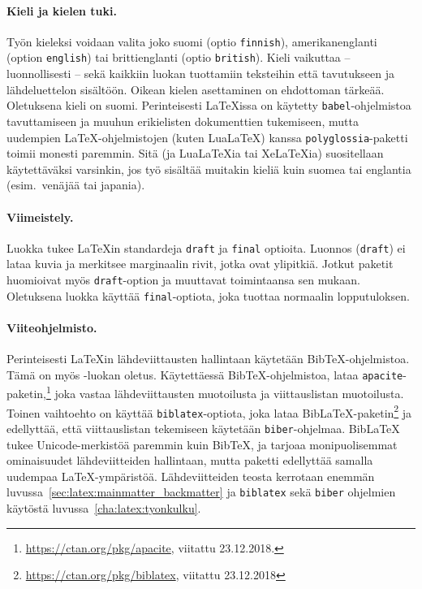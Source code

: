 \paragraph{Kieli ja kielen tuki.}

Työn kieleksi voidaan valita joko suomi (optio \texttt{finnish}), amerikanenglanti (option \texttt{english}) tai brittienglanti (optio \texttt{british}). Kieli vaikuttaa -- luonnollisesti -- sekä kaikkiin luokan tuottamiin teksteihin että tavutukseen ja lähdeluettelon sisältöön. Oikean kielen asettaminen on ehdottoman tärkeää. Ole\-tuk\-se\-na kieli on suomi. Perinteisesti \LaTeX{issa} on käytetty \texttt{babel}-ohjelmistoa tavuttamiseen ja muuhun erikielisten dokumenttien tukemiseen, mutta uudempien \LaTeX-ohjelmistojen (kuten Lua\LaTeX) kanssa \texttt{polyglossia}-paketti toimii monesti paremmin. Sitä (ja Lua\LaTeX{ia} tai Xe\LaTeX{ia}) suositellaan käytettäväksi varsinkin, jos työ sisältää muitakin kieliä kuin suomea tai englantia (esim.\ venäjää tai japania). 

\paragraph{Viimeistely.}

Luokka tukee \LaTeX{in} standardeja \texttt{draft} ja \texttt{final} optioita. Luonnos (\texttt{draft}) ei lataa kuvia ja merkitsee marginaalin rivit, jotka ovat ylipitkiä. Jotkut paketit huomioivat myös \texttt{draft}-option ja muuttavat toimintaansa sen mukaan. Ole\-tuk\-se\-na luokka käyttää \texttt{final}-optiota, joka tuottaa normaalin lopputuloksen.

\paragraph{Viiteohjelmisto.}

Perinteisesti \LaTeX{in} lähdeviittausten hallintaan käytetään Bib\TeX-oh\-jel\-mis\-toa. Tämä on myös \uefcsthesis-luokan oletus. Käytettäessä Bib\TeX-oh\-jel\-mis\-toa, \uefcsthesis lataa \texttt{apacite}-paketin,\!\footnote{\url{https://ctan.org/pkg/apacite}, viitattu 23.12.2018.} joka vastaa lähdeviittausten muotoilusta ja viittauslistan muotoilusta. Toinen vaihtoehto on käyttää \texttt{biblatex}-optiota, joka lataa Bib\LaTeX-paketin\footnote{\url{https://ctan.org/pkg/biblatex}, viitattu 23.12.2018} ja edellyttää, että viittauslistan tekemiseen käytetään \texttt{biber}-ohjelmaa. Bib\LaTeX{} tukee Unicode-merkistöä paremmin kuin Bib\TeX, ja tarjoaa monipuolisemmat ominaisuudet lähdeviitteiden hallintaan, mutta paketti edellyttää samalla uudempaa \LaTeX-ympäristöä. Lähdeviitteiden teosta kerrotaan enemmän luvussa~\ref{sec:latex:mainmatter_backmatter} ja \texttt{biblatex} sekä \texttt{biber} ohjelmien käytöstä luvussa~\ref{cha:latex:tyonkulku}.

